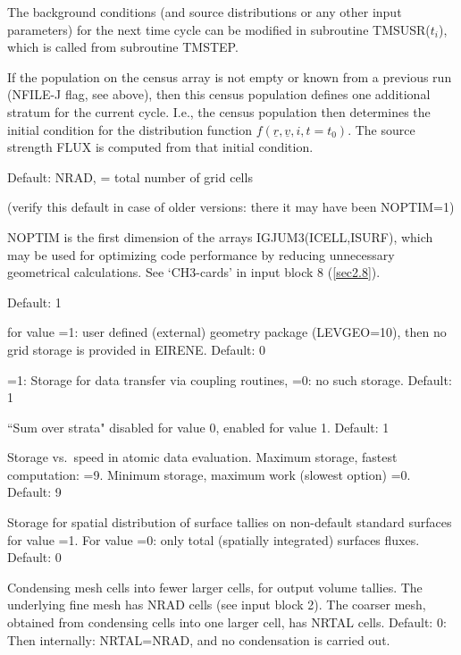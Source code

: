 \begin{description}
        The background conditions (and source distributions or any other input
        parameters) for the next time cycle can be modified in subroutine
        TMSUSR($t_i$), which is called from subroutine TMSTEP.

        If the population on the census array is not empty or known from a previous run
        (NFILE-J flag, see above), then this census population defines one additional
        stratum for the current cycle.
        I.e., the census population then determines the initial condition for the
        distribution function $f(\underline{r},\underline{v}, i, t = t_0)$.
        The source strength FLUX is computed from that initial condition.
  \item[NOPTIM] Default: NRAD, = total number of grid cells 

        (verify this default in case of older versions: there it may have been
        NOPTIM=1) 

        NOPTIM is the first dimension of the arrays IGJUM3(ICELL,ISURF), which may be
        used for optimizing code performance by reducing unnecessary geometrical
        calculations.
        See `CH3-cards' in input block 8 (\cref{sec2.8}).
  \item[NOPTM1] Default: 1
  \item[NGEOM\_USR] for value =1: user defined
        (external) geometry package (LEVGEO=10), then no grid storage is provided in
        EIRENE.
        Default: 0
  \item[NCOUP\_INPUT] =1: Storage for data transfer via coupling
        routines, =0:
        no such storage.
        Default: 1
  \item[NSMSTRA] ``Sum over strata" disabled for value 0, enabled for
        value 1.
        Default: 1
  \item[NSTORAM] Storage vs.\ speed in atomic data evaluation.
        Maximum storage, fastest computation: =9.
        Minimum storage, maximum work (slowest option) =0.
        Default: 9
  \item[NGSTAL] Storage for spatial distribution of surface tallies on
        non-default standard surfaces for value =1.
        For value =0: only total (spatially integrated) surfaces fluxes.
        Default: 0
  \item[NRTAL] Condensing mesh cells into fewer larger cells, for
        output volume tallies.
        The underlying fine mesh has NRAD cells (see input block 2).
        The coarser mesh, obtained from condensing cells into one larger cell, has
        NRTAL cells.
        Default: 0: Then internally: NRTAL=NRAD, and no condensation is carried out.


\end{description}
